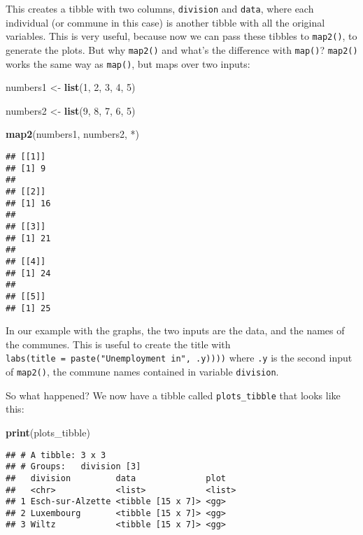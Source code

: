 \documentclass[
]{article}
\newenvironment{Shaded}{\begin{snugshade}}{\end{snugshade}}
\newcommand{\DataTypeTok}[1]{\textcolor[rgb]{0.13,0.29,0.53}{#1}}
\newcommand{\DecValTok}[1]{\textcolor[rgb]{0.00,0.00,0.81}{#1}}
\newcommand{\KeywordTok}[1]{\textcolor[rgb]{0.13,0.29,0.53}{\textbf{#1}}}
\newcommand{\NormalTok}[1]{#1}
\newcommand{\StringTok}[1]{\textcolor[rgb]{0.31,0.60,0.02}{#1}}
\begin{document}
This creates a tibble with two columns, \texttt{division} and \texttt{data}, where each individual (or
commune in this case) is another tibble with all the original variables. This is very useful,
because now we can pass these tibbles to \texttt{map2()}, to generate the plots. But why \texttt{map2()} and
what's the difference with \texttt{map()}? \texttt{map2()} works the same way as \texttt{map()}, but maps over two
inputs:

\begin{Shaded}
\begin{Highlighting}[]
\NormalTok{numbers1 \textless{}{-}}\StringTok{ }\KeywordTok{list}\NormalTok{(}\DecValTok{1}\NormalTok{, }\DecValTok{2}\NormalTok{, }\DecValTok{3}\NormalTok{, }\DecValTok{4}\NormalTok{, }\DecValTok{5}\NormalTok{)}

\NormalTok{numbers2 \textless{}{-}}\StringTok{ }\KeywordTok{list}\NormalTok{(}\DecValTok{9}\NormalTok{, }\DecValTok{8}\NormalTok{, }\DecValTok{7}\NormalTok{, }\DecValTok{6}\NormalTok{, }\DecValTok{5}\NormalTok{)}

\KeywordTok{map2}\NormalTok{(numbers1, numbers2, }\StringTok{\textasciigrave{}}\DataTypeTok{*}\StringTok{\textasciigrave{}}\NormalTok{)}
\end{Highlighting}
\end{Shaded}

\begin{verbatim}
## [[1]]
## [1] 9
## 
## [[2]]
## [1] 16
## 
## [[3]]
## [1] 21
## 
## [[4]]
## [1] 24
## 
## [[5]]
## [1] 25
\end{verbatim}

In our example with the graphs, the two inputs are the data, and the names of the communes. This is
useful to create the title with \texttt{labs(title\ =\ paste("Unemployment\ in",\ .y))))} where \texttt{.y} is the
second input of \texttt{map2()}, the commune names contained in variable \texttt{division}.

So what happened? We now have a tibble called \texttt{plots\_tibble} that looks like this:

\begin{Shaded}
\begin{Highlighting}[]
\KeywordTok{print}\NormalTok{(plots\_tibble)}
\end{Highlighting}
\end{Shaded}

\begin{verbatim}
## # A tibble: 3 x 3
## # Groups:   division [3]
##   division         data              plot  
##   <chr>            <list>            <list>
## 1 Esch-sur-Alzette <tibble [15 x 7]> <gg>  
## 2 Luxembourg       <tibble [15 x 7]> <gg>  
## 3 Wiltz            <tibble [15 x 7]> <gg>
\end{verbatim}
\end{document}
